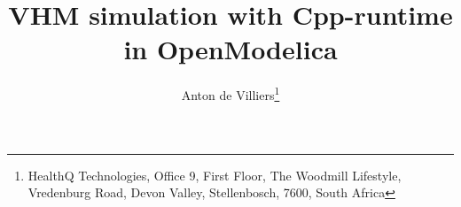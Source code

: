 \documentclass[10pt]{article}
\title{VHM simulation with {\sf Cpp}-runtime in OpenModelica}
\author{Anton de Villiers\thanks{HealthQ Technologies, Office 9, First Floor, The Woodmill Lifestyle, Vredenburg Road, Devon Valley,
Stellenbosch, 7600, South Africa}}
\begin{document}
\setcounter{page}{1}



\newcommand{\blokkie}{\hspace{.07cm}\Box\hspace{.07cm}}

\newcommand{\headcol}{\rowcolor{tableheadcolor}}
\newcommand{\rowcol}{\rowcolor{tablerowcolor}}

\newcommand{\topline}{\arrayrulecolor{black}\specialrule{0.1em}{\abovetopsep}{0pt}%
	\arrayrulecolor{tableheadcolor}\specialrule{\belowrulesep}{0pt}{0pt}%
	\arrayrulecolor{black}}

\newcommand{\toplinee}{\arrayrulecolor{black}\specialrule{0.1em}{\abovetopsep}{0pt}%
	\arrayrulecolor{tablerowcolor}\specialrule{\belowrulesep}{0pt}{0pt}%
	\arrayrulecolor{black}}

\newcommand{\midline}{\arrayrulecolor{tableheadcolor}\specialrule{\aboverulesep}{0pt}{0pt}%
	\arrayrulecolor{black}\specialrule{\lightrulewidth}{0pt}{0pt}%
	\arrayrulecolor{white}\specialrule{\belowrulesep}{0pt}{0pt}%
	\arrayrulecolor{black}}

\newcommand{\midlinecbw}{\arrayrulecolor{tablerowcolor}\specialrule{\aboverulesep}{0pt}{0pt}%
	\arrayrulecolor{black}\specialrule{\lightrulewidth}{0pt}{0pt}%
 	\arrayrulecolor{white}\specialrule{\belowrulesep}{0pt}{0pt}%
	\arrayrulecolor{black}}

\newcommand{\midlinecw}{\arrayrulecolor{tablerowcolor}\specialrule{\aboverulesep}{0pt}{0pt}%
	\arrayrulecolor{tablerowcolor}\specialrule{\lightrulewidth}{0pt}{0pt}%
	\arrayrulecolor{white}\specialrule{\belowrulesep}{0pt}{0pt}%
	\arrayrulecolor{black}}

\newcommand{\midlinewbc}{\arrayrulecolor{white}\specialrule{\aboverulesep}{0pt}{0pt}%
	\arrayrulecolor{black}\specialrule{\lightrulewidth}{0pt}{0pt}%
	\arrayrulecolor{tablerowcolor}\specialrule{\belowrulesep}{0pt}{0pt}%
	\arrayrulecolor{black}}

\newcommand{\midlinehr}{\arrayrulecolor{tablerowcolor}\specialrule{\aboverulesep}{0pt}{0pt}%
	\arrayrulecolor{black}\specialrule{\lightrulewidth}{0pt}{0pt}%
	\arrayrulecolor{tableheadcolor}\specialrule{\belowrulesep}{0pt}{0pt}%
	\arrayrulecolor{tablerowcolor}}
\end{document}
